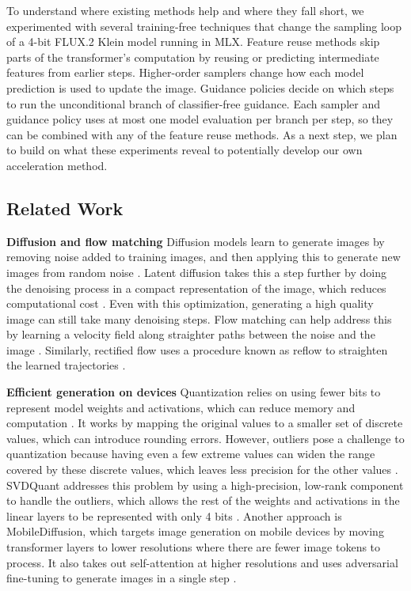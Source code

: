 \documentclass[12pt,letterpaper]{article}
\begin{document}
To understand where existing methods help and where they fall short, we experimented with several training-free techniques that change the sampling loop of a 4-bit FLUX.2 Klein model running in MLX. Feature reuse methods skip parts of the transformer's computation by reusing or predicting intermediate features from earlier steps. Higher-order samplers change how each model prediction is used to update the image. Guidance policies decide on which steps to run the unconditional branch of classifier-free guidance. Each sampler and guidance policy uses at most one model evaluation per branch per step, so they can be combined with any of the feature reuse methods. As a next step, we plan to build on what these experiments reveal to potentially develop our own acceleration method.

\subsection{Related Work}
\label{sec:related}

\textbf{Diffusion and flow matching}
Diffusion models learn to generate images by removing noise added to training images, and then applying this to generate new images from random noise
\citep{ho2020denoisingdiffusionprobabilisticmodels}.
Latent diffusion takes this a step further by doing the denoising process in a compact representation of the image, which reduces computational cost
\citep{rombach2021highresolution}. Even with this optimization, generating a high quality image can still take many denoising steps. Flow matching can help address this by learning a velocity field along straighter paths between the noise and the image \citep{lipman2023flowmatchinggenerativemodeling}. Similarly, rectified flow uses a procedure known as reflow to straighten the learned trajectories \citep{liu2023iclr-flow}.

\textbf{Efficient generation on devices}
Quantization relies on using fewer bits to represent model weights and activations, which can reduce memory and computation \citep{jacob2017quantizationtrainingneuralnetworks}. It works by mapping the original values to a smaller set of discrete values, which can introduce rounding errors.
However, outliers pose a challenge to quantization because having even a few extreme values can widen the range covered by these discrete values, which leaves less precision for the other values \citep{li2025svdquantabsorbingoutlierslowrank}.
SVDQuant addresses this problem by using a high-precision, low-rank component to handle the outliers, which allows the rest of the weights and activations in the linear layers to be represented with only 4 bits \citep{li2025svdquantabsorbingoutlierslowrank}. Another approach is MobileDiffusion, which targets image generation on mobile devices by moving transformer layers to lower resolutions where there are fewer image tokens to process. It also takes out self-attention at higher resolutions and uses adversarial fine-tuning to generate images in a single step
\citep{zhao2024mobilediffusioninstanttexttoimagegeneration}.
\end{document}
